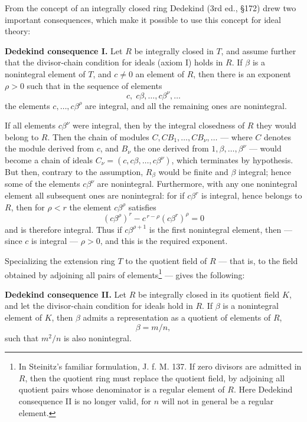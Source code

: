 \documentclass[11pt]{article}
\begin{document}
From the concept of an integrally closed ring Dedekind (3rd ed., §172) drew two
important consequences, which make it possible to use this concept for ideal theory:

\medskip
\noindent\textbf{Dedekind consequence I.} Let $R$ be integrally closed in $T$, and
assume further that the divisor-chain condition for ideals (axiom I) holds in $R$.
If $\beta$ is a nonintegral element of $T$, and $c\ne0$ an element of $R$, then
there is an exponent $\rho>0$ such that in the sequence of elements
\[
        c,\;c\beta,\ldots,c\beta^\nu,\ldots
\]
the elements $c,\ldots,c\beta^\rho$ are integral, and all the remaining ones are
nonintegral.

If all elements $c\beta^\nu$ were integral, then by the integral closedness of $R$
they would belong to $R$. Then the chain of modules $C,CB_1,\ldots,CB_\nu,\ldots$
— where $C$ denotes the module derived from $c$, and $B_\nu$ the one derived
from $1,\beta,\ldots,\beta^\nu$ — would become a chain of ideals
$C_\nu=(c,c\beta,\ldots,c\beta^\nu)$, which terminates by hypothesis. But then,
contrary to the assumption, $R_\beta$ would be finite and $\beta$ integral; hence
some of the elements $c\beta^\nu$ are nonintegral. Furthermore, with any one
nonintegral element all subsequent ones are nonintegral: for if $c\beta^r$ is
integral, hence belongs to $R$, then for $\rho<r$ the element $c\beta^\rho$ satisfies
\[
        (c\beta^\rho)^r-c^{\,r-\rho}(c\beta^r)^\rho=0
\]
and is therefore integral. Thus if $c\beta^{\rho+1}$ is the first nonintegral element,
then — since $c$ is integral — $\rho>0$, and this is the required exponent.

Specializing the extension ring $T$ to the quotient field of $R$ — that is, to the
field obtained by adjoining all pairs of elements\footnote{In Steinitz's familiar
formulation, J. f. M. 137. If zero divisors are admitted in $R$, then the quotient
ring must replace the quotient field, by adjoining all quotient pairs whose denominator
is a regular element of $R$. Here Dedekind consequence II is no longer valid, for
$n$ will not in general be a regular element.} — gives the following:

\medskip
\noindent\textbf{Dedekind consequence II.} Let $R$ be integrally closed in its
quotient field $K$, and let the divisor-chain condition for ideals hold in $R$. If
$\beta$ is a nonintegral element of $K$, then $\beta$ admits a representation as
a quotient of elements of $R$,
\[
        \beta=m/n,
\]
such that $m^2/n$ is also nonintegral.
\end{document}
